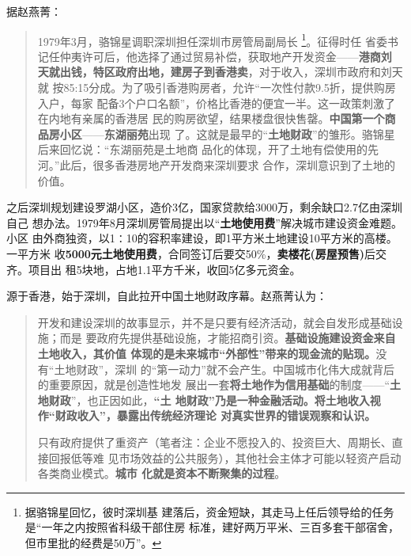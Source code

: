 据赵燕菁\cite{dajueqi}：
\begin{quotation}
  1979年3月，骆锦星调职深圳担任深圳市房管局副局长 \footnote{据骆锦星回忆，彼时深圳基
    建落后，资金短缺，其走马上任后领导给的任务是“一年之内按照省科级干部住房
    标准，建好两万平米、三百多套干部宿舍，但市里批的经费是50万”。}。征得时任
  省委书记任仲夷许可后，他选择了通过贸易补偿，获取地产开发资金——\textbf{港商刘
    天就出钱，特区政府出地，建房子到香港卖}，对于收入，深圳市政府和刘天就
  按85:15分成。为了吸引香港购房者，允许“一次性付款9.5折，提供购房入户，每家
  配备3个户口名额”，价格比香港的便宜一半。这一政策刺激了在内地有亲属的香港居
  民的购房欲望，结果楼盘很快售罄。\textbf{中国第一个商品房小区}——\textbf{东湖丽苑}出现
  了。这就是最早的“\textbf{土地财政}”的雏形。骆锦星后来回忆说：“东湖丽苑是土地商
  品化的体现，开了土地有偿使用的先河。”此后，很多香港房地产开发商来深圳要求
  合作，深圳意识到了土地的价值。
\end{quotation}

之后深圳规划建设罗湖小区，造价3亿，国家贷款给3000万，剩余缺口2.7亿由深圳自己
想办法。1979年8月深圳房管局提出以“\textbf{土地使用费}”解决城市建设资金难题。小区
由外商独资，以1∶10的容积率建设，即1平方米土地建设10平方米的高楼。一平方米
收\textbf{5000元土地使用费}，合同签订后要交50\%，\textbf{卖楼花(房屋预售)}后交齐。项目出
租5块地，占地1.1平方千米，收回5亿多元资金。

源于香港，始于深圳，自此拉开中国土地财政序幕。赵燕菁认为：
\begin{quotation}
  开发和建设深圳的故事显示，并不是只要有经济活动，就会自发形成基础设施；而是
  要政府先提供基础设施，才能招商引资。\textbf{基础设施建设资金来自土地收入，其价值
    体现的是未来城市“外部性”带来的现金流的贴现。}没有“土地财政”，深圳
  的“第一动力”就不会产生。中国城市化伟大成就背后的重要原因，就是创造性地发
  展出一套\textbf{将土地作为信用基础}的制度——“\textbf{土地财政}”，也正因如此，\textbf{“土
    地财政”乃是一种金融活动。将土地收入视作“财政收入”，暴露出传统经济理论
    对真实世界的错误观察和认识。}

  只有政府提供了重资产（笔者注：企业不愿投入的、投资巨大、周期长、直接回报低等难
  见市场效益的公共服务），其他社会主体才可能以轻资产启动各类商业模式。\textbf{城市
    化就是资本不断聚集的过程}。
\end{quotation}

